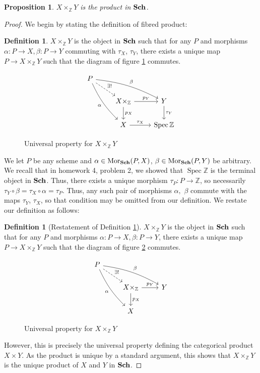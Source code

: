 \documentclass[english,letter,doublesided]{article}
\DeclareMathOperator{\spec}{Spec}
\newcommand{\mor}{\mathrm{Mor}}
\newcommand{\ZZ}{\mathbb{Z}}
\newcommand{\prob}[1]{\setcounter{section}{#1-1}\section{}}
\newtheorem*{prop*}{Proposition}
\theoremstyle{remark}
\theoremstyle{definition}
\newtheorem{defn}[thm]{Definition}
\newcommand{\cat}[1]{{\mathrm{\bf{#1}}}}
\begin{document}
\prob{7}\begin{prop*}
	$X\times_{\ZZ}Y$ is the product in $\cat{Sch}$. 
\end{prop*}
\begin{proof}
We begin by stating the definition of fibred product:
\begin{defn}\label{7defn:fp}
 $X\times_\ZZ Y$ is the object in $\cat{Sch}$ such that for any $P$ and morphisms $\alpha:P\to X,\beta:P\to Y$ commuting with $\tau_X$, $\tau_Y$, there exists a unique map $P\to X\times_\ZZ Y$ such that the diagram of figure \ref{7fpd} commutes.
	\begin{figure}[h!]
		$$\begin{tikzcd}
		P\arrow[dr,dashrightarrow,"\exists!"]\arrow[ddr,bend right =10, "\alpha",swap]\arrow[drr,bend left=10, "\beta"]&&\\
		&X\times_\ZZ\arrow[d,"p_X"]\arrow[r,"p_Y"] &Y\arrow[d,"\tau_Y"]\\
		&X\arrow[r,"\tau_X"]&\spec \ZZ
		\end{tikzcd}$$\caption{Universal property for $X\times_\ZZ Y$\label{7fpd}}
	\end{figure}\end{defn}

We let $P$ be any scheme and $\alpha\in \mor_\cat{Sch}(P,X)$, $\beta\in \mor_\cat{Sch}(P,Y)$ be arbitrary. We recall that in homework 4, problem 2, we showed that $\spec \ZZ$ is the terminal object in $\cat{Sch}$. Thus, there exists a unique morphism $\tau_P:P\to \ZZ$, so necessarily $\tau_Y\circ \beta=\tau_X\circ \alpha=\tau_P$. Thus, any such pair of morphisms $\alpha,$ $\beta$ commute with the maps $\tau_Y$, $\tau_X$, so that condition may be omitted from our definition. We restate our definition as follows:
\begin{defn}[Restatement of Definition \ref{7fpd}]
	 $X\times_\ZZ Y$ is the object in $\cat{Sch}$ such that for any $P$ and morphisms $\alpha:P\to X,\beta:P\to Y$, there exists a unique map $P\to X\times_\ZZ Y$ such that the diagram of figure \ref{7fpd2} commutes.
	\begin{figure}[h!]
		$$\begin{tikzcd}
		P\arrow[dr,dashrightarrow,"\exists!"]\arrow[ddr,bend right =10, "\alpha",swap]\arrow[drr,bend left=10, "\beta"]&&\\
		&X\times_\ZZ\arrow[d,"p_X"]\arrow[r,"p_Y"] &Y\\
		&X&
		\end{tikzcd}$$\caption{Universal property for $X\times_\ZZ Y$\label{7fpd2}}
\end{figure}
\end{defn}
However, this is precisely the universal property defining the categorical product $X\times Y$. As the product is unique by a standard argument, this shows that $X\times_\ZZ Y$ is the unique product of $X$ and $Y$ in $\cat{Sch}$.
\end{proof}
\end{document}
